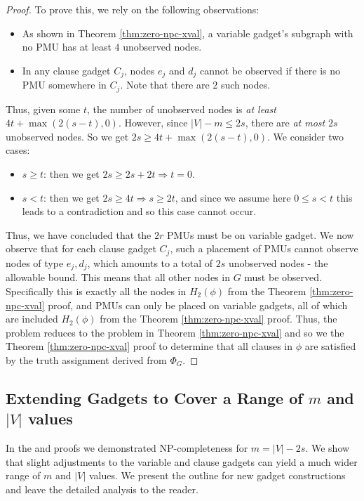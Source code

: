 \begin{proof}
To prove this, we rely on the following observations:
\begin{itemize}
	\item As shown in Theorem \ref{thm:zero-npc-xval}, a variable gadget's subgraph with no PMU has at least $4$ unobserved nodes.
	\item In any clause gadget $C_j$, nodes $e_j$ and $d_j$ cannot be observed if there is no PMU somewhere in $C_j$. Note that there are $2$ such nodes. 
\end{itemize}
Thus, given some $t$, the number of unobserved nodes is {\it at least} $4t + \max(2(s-t), 0)$. However, since $|V|-m \leq 2s$, there are {\em at most}  $2s$ unobserved nodes. So we get 
$2s \geq 4t + \max(2(s-t), 0)$. We consider two cases:
\begin{itemize}
	\item $s\geq t$: then we get $2s \geq 2s+2t \Rightarrow t=0.$
	\item $s < t$:	then we get $2s \geq 4t \Rightarrow s\geq 2t$, and since we assume here $0\leq s < t$ this leads to a contradiction and so this case cannot occur.
\end{itemize}

Thus, we have concluded that the $2r$ PMUs must be on variable gadget. %
We now observe that for each clause gadget $C_j$, such a placement of PMUs cannot observe nodes of type  $e_j, d_j$, which amounts to a total of $2s$ unobserved nodes - the allowable bound.
This means that all other nodes in $G$ must be observed. Specifically this is exactly all the nodes in $H_2(\phi)$ from the Theorem \ref{thm:zero-npc-xval} proof, and PMUs can only be placed on 
variable gadgets, all of which are included $H_2(\phi)$ from the Theorem \ref{thm:zero-npc-xval} proof. Thus, the problem reduces to the problem in Theorem \ref{thm:zero-npc-xval} and so we 
the Theorem \ref{thm:zero-npc-xval} proof to determine that all clauses in $\phi$ are satisfied by the truth assignment derived from $\Phi_G$. 
\end{proof}



\subsection{Extending Gadgets to Cover a Range of $m$ and $|V|$ values}
\label{subsec:zero-extend}

In the \xvalpart and \maxinc proofs we demonstrated NP-completeness for $m=|V|-2s$. 
We show that slight adjustments to the variable and clause gadgets can yield a much wider range of $m$ and $|V|$ values. 
We present the outline for new gadget constructions and leave the detailed analysis to the reader.

